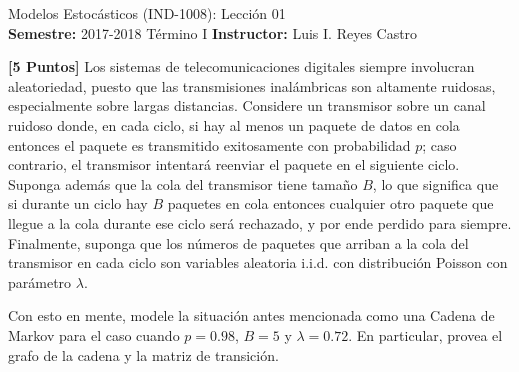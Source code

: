 \documentclass[ a4paper, twoside, 11pt]{article}
\newcommand{\numero}{01}
\begin{document}
\allowdisplaybreaks

\begin{center}
\Large Modelos Estoc\'asticos (IND-1008): Lecci\'on \numero \\[1ex]
\small \textbf{Semestre:} 2017-2018 T\'ermino I \qquad
\textbf{Instructor:} Luis I. Reyes Castro
\end{center}
\halfskip



\begin{problem}
\textbf{[5 Puntos]} Los sistemas de telecomunicaciones digitales siempre involucran aleatoriedad, puesto que las transmisiones inal\'ambricas son altamente ruidosas, especialmente sobre largas distancias. Considere un transmisor sobre un canal ruidoso donde, en cada ciclo, \linebreak si hay al menos un paquete de datos en cola entonces el paquete es transmitido exitosamente con probabilidad $p$; caso contrario, el transmisor intentar\'a reenviar el paquete en el siguiente ciclo. Suponga adem\'as que la cola del transmisor tiene tama\~no $B$, lo que significa que si durante un ciclo hay $B$ paquetes en cola entonces cualquier otro paquete que llegue a la cola durante ese ciclo ser\'a rechazado, y por ende perdido para siempre. Finalmente, suponga que los n\'umeros de paquetes que arriban a la cola del transmisor en cada ciclo son variables aleatoria i.i.d. con distribuci\'on Poisson con par\'ametro $\lambda$. 

Con esto en mente, modele la situaci\'on antes mencionada como una Cadena de Markov para el caso cuando $p = 0.98$, $B = 5$ y $\lambda = 0.72$. En particular, provea el grafo de la cadena y la matriz de transici\'on. 

\end{problem}
\vspace{\baselineskip}
\end{document}
